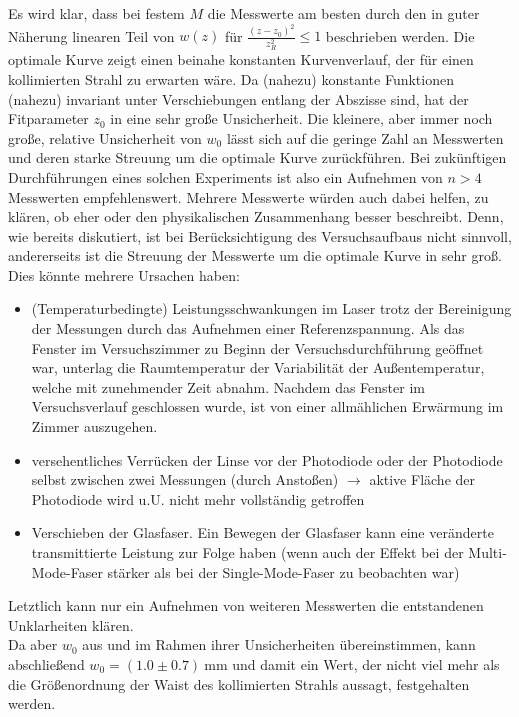 \documentclass[11pt,a4paper,oneside]{scrartcl}
\begin{document}
Es wird klar, dass bei festem $M$ die Messwerte am besten durch den in guter Näherung linearen Teil von $w(z)$ für $\frac{(z-z_0)^2}{z_R^2}\leq1$ beschrieben werden. Die optimale Kurve zeigt einen beinahe konstanten Kurvenverlauf, der für einen kollimierten Strahl zu erwarten wäre. Da (nahezu) konstante Funktionen (nahezu) invariant unter Verschiebungen entlang der Abszisse sind, hat der Fitparameter $z_0$ in  eine sehr große Unsicherheit. Die kleinere, aber immer noch große, relative Unsicherheit von $w_0$ lässt sich auf die geringe Zahl an Messwerten und deren starke Streuung um die optimale Kurve zurückführen. Bei zukünftigen Durchführungen eines solchen Experiments ist also ein Aufnehmen von $n>4$ Messwerten empfehlenswert. Mehrere Messwerte würden auch dabei helfen, zu klären, ob eher  oder  den physikalischen Zusammenhang besser beschreibt. Denn, wie bereits diskutiert, ist  bei Berücksichtigung des Versuchsaufbaus nicht sinnvoll, andererseits ist die Streuung der Messwerte um die optimale Kurve in  sehr groß. Dies könnte mehrere Ursachen haben:
\begin{itemize}
\item (Temperaturbedingte) Leistungsschwankungen im Laser trotz der Bereinigung der Messungen durch das Aufnehmen einer Referenzspannung. Als das Fenster im Versuchszimmer zu Beginn der Versuchsdurchführung geöffnet war, unterlag die Raumtemperatur der Variabilität der Außentemperatur, welche mit zunehmender Zeit abnahm. Nachdem das Fenster im Versuchsverlauf geschlossen wurde, ist von einer allmählichen Erwärmung im Zimmer auszugehen. 
\item versehentliches Verrücken der Linse vor der Photodiode oder der Photodiode selbst zwischen zwei Messungen (durch Anstoßen) $\rightarrow$ aktive Fläche der Photodiode wird u.U. nicht mehr vollständig getroffen
\item Verschieben der Glasfaser. Ein Bewegen der Glasfaser kann eine veränderte transmittierte Leistung zur Folge haben (wenn auch der Effekt bei der Multi-Mode-Faser stärker als bei der Single-Mode-Faser zu beobachten war)
\end{itemize}
Letztlich kann nur ein Aufnehmen von weiteren Messwerten die entstandenen Unklarheiten klären.\\
Da aber $w_0$ aus  und  im Rahmen ihrer Unsicherheiten übereinstimmen, kann abschließend $w_0=(1.0\pm0.7)\ \mathrm{mm}$ und damit ein Wert, der nicht viel mehr als die Größenordnung der Waist des kollimierten Strahls aussagt, festgehalten werden. 
\end{document}
